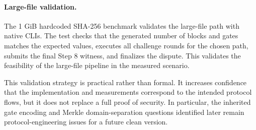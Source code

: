 \paragraph{Large-file validation.}
The 1 GiB hardcoded SHA-256 benchmark validates the large-file path with native CLIs. The
test checks that the generated number of blocks and gates matches the expected values,
executes all challenge rounds for the chosen path, submits the final Step 8 witness, and
finalizes the dispute. This validates the feasibility of the large-file pipeline in the
measured scenario.

This validation strategy is practical rather than formal. It increases confidence that the
implementation and measurements correspond to the intended protocol flows, but it does not
replace a full proof of security. In particular, the inherited gate encoding and Merkle
domain-separation questions identified later remain protocol-engineering issues for a future
clean version.
